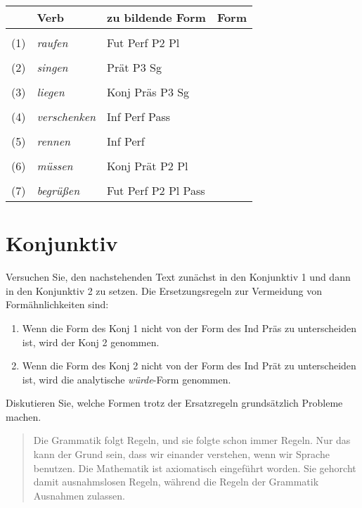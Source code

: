 \documentclass[12pt,a4paper,twoside]{article}
\newcommand{\Lf}{
  \setlength{\itemsep}{1pt}
  \setlength{\parskip}{0pt}
  \setlength{\parsep}{0pt}
}
\begin{document}
\begin{center}
  \begin{tabular}[h]{cllp{}}
    \toprule
    & \textbf{Verb} & \textbf{zu bildende Form} & \textbf{Form} \\
    \midrule
    &&& \\
    (1) & \textit{raufen} & Fut Perf P2 Pl & \\\cline{4-4}
    &&& \\
    (2) & \textit{singen} & Prät P3 Sg & \\\cline{4-4}
    &&& \\
    (3) & \textit{liegen} & Konj Präs P3 Sg & \\\cline{4-4}
    &&& \\
    (4) & \textit{verschenken} & Inf Perf Pass & \\\cline{4-4}
    &&& \\
    (5) & \textit{rennen} & Inf Perf & \\\cline{4-4}
    &&& \\
    (6) & \textit{müssen} & Konj Prät P2 Pl & \\\cline{4-4}
    &&& \\
    (7) & \textit{begrüßen} & Fut Perf P2 Pl Pass & \\\cline{4-4}
  \end{tabular}
\end{center}

\section{Konjunktiv}

Versuchen Sie, den nachstehenden Text zunächst in den Konjunktiv 1 und dann in den Konjunktiv 2 zu setzen.
Die Ersetzungsregeln zur Vermeidung von Formähnlichkeiten sind:

\begin{enumerate}\Lf
  \item Wenn die Form des Konj 1 nicht von der Form des Ind Präs zu unterscheiden ist, wird der Konj 2 genommen.
  \item Wenn die Form des Konj 2 nicht von der Form des Ind Prät zu unterscheiden ist, wird die analytische \textit{würde}-Form genommen.
\end{enumerate}

Diskutieren Sie, welche Formen trotz der Ersatzregeln grundsätzlich Probleme machen.

\begin{quote}
  Die Grammatik folgt Regeln, und sie folgte schon immer Regeln.
  Nur das kann der Grund sein, dass wir einander verstehen, wenn wir Sprache benutzen.
  Die Mathematik ist axiomatisch eingeführt worden.
  Sie gehorcht damit ausnahmslosen Regeln, während die Regeln der Grammatik Ausnahmen zulassen.
\end{quote}
\end{document}
